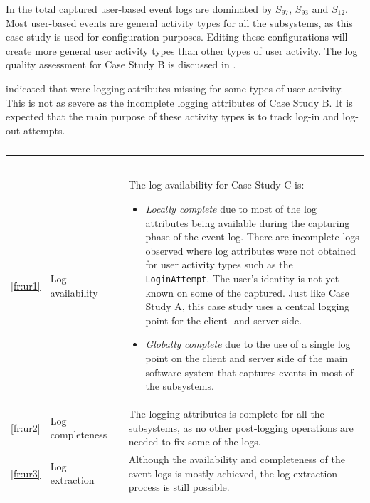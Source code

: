 In  the total captured user-based event logs are dominated by $S_{97}$, $S_{93}$ and $S_{12}$. Most user-based events are general activity types for all the subsystems, as this case study is used for configuration purposes. Editing these configurations will create more general user activity types than other types of user activity. The log quality assessment for Case Study B is discussed in . \par {} indicated that were logging attributes missing for some types of user activity. This is not as severe as the incomplete logging attributes of Case Study B. It is expected that the main purpose of these activity types is to track log-in and log-out attempts.

\begin{xltabular}{\textwidth}{clcX}
	\caption[Logging quality assessment of Case Study C]{\textit{Logging quality assessment of Case Study C}}\label{tbl:ch3_caseCQuality}\\
	\toprule
	 &  &  &  \\
	\midrule
	\endfirsthead

	\caption[]{\continueCaption} \\
	\toprule
	 &  &  &  \\
	\midrule
	\endhead

	\midrule
	 \\ 
	\endfoot
	\endlastfoot

	\ref{fr:ur1} & Log availability & \cmark & \RaggedRight The log availability for Case Study C is: \begin{itemize}
			\item \textit{Locally complete} due to most of the log attributes being available during the capturing phase of the event log. There are incomplete logs observed where log attributes were not obtained for user activity types such as the \texttt{LoginAttempt}. The user's identity is not yet known on some of the captured. Just like Case Study A, this case study uses a central logging point for the client- and server-side.
			\item \textit{Globally complete} due to the use of a single log point on the client and server side of the main software system that captures events in most of the subsystems. 
		\end{itemize} \\
	\ref{fr:ur2} & Log completeness & \cmark & The logging attributes is complete for all the subsystems, as no other post-logging operations are needed to fix some of the logs. \\
	\ref{fr:ur3} & Log extraction & \cmark & Although the availability and completeness of the event logs is mostly achieved, the log extraction process is still possible. \\
	\bottomrule
\end{xltabular}

